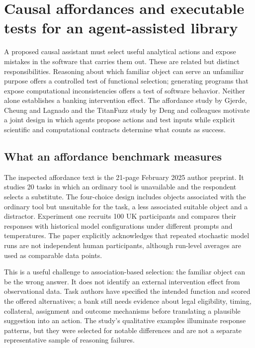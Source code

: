 \section{Causal affordances and executable tests for an agent-assisted library}
\label{sec:exec24-affordance-fuzzing}
A proposed causal assistant must select useful analytical actions and expose mistakes in the software that carries them out. These are related but distinct responsibilities. Reasoning about which familiar object can serve an unfamiliar purpose offers a controlled test of functional selection; generating programs that expose computational inconsistencies offers a test of software behavior. Neither alone establishes a banking intervention effect. The affordance study by Gjerde, Cheung and Lagnado and the TitanFuzz study by Deng and colleagues motivate a joint design in which agents propose actions and test inputs while explicit scientific and computational contracts determine what counts as success.\citep{exec24_affordance_original,exec24_fuzzing_original,exec24_affordance_fuzzing_reference}

\subsection{What an affordance benchmark measures}
The inspected affordance text is the 21-page February 2025 author preprint. It studies 20 tasks in which an ordinary tool is unavailable and the respondent selects a substitute. The four-choice design includes objects associated with the ordinary tool but unsuitable for the task, a less associated suitable object and a distractor. Experiment one recruits 100 UK participants and compares their responses with historical model configurations under different prompts and temperatures. The paper explicitly acknowledges that repeated stochastic model runs are not independent human participants, although run-level averages are used as comparable data points.\citep{exec24_affordance_original}

This is a useful challenge to association-based selection: the familiar object can be the wrong answer. It does not identify an external intervention effect from observational data. Task authors have specified the intended function and scored the offered alternatives; a bank still needs evidence about legal eligibility, timing, collateral, assignment and outcome mechanisms before translating a plausible suggestion into an action. The study's qualitative examples illuminate response patterns, but they were selected for notable differences and are not a separate representative sample of reasoning failures.\citep{exec24_affordance_original,exec24_affordance_fuzzing_reference}

